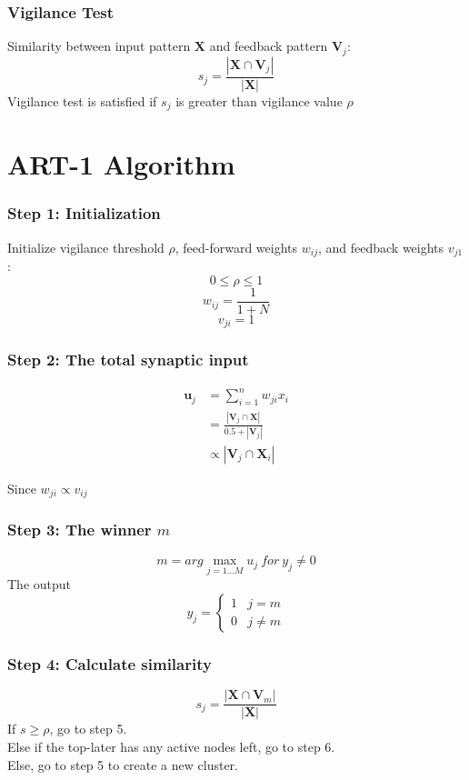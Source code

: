 \subsubsection{Vigilance Test}
Similarity between input pattern $\mathbf{X}$ and feedback pattern $\mathbf{V}_j$:
$$s_j = \frac{|\mathbf{X} \cap \mathbf{V}_j|}{| \mathbf{X} |}$$
Vigilance test is satisfied if $s_j$ is greater than vigilance value $\rho$

\section{ART-1 Algorithm}
\subsubsection{Step 1: Initialization}
Initialize vigilance threshold $\rho$, feed-forward weights $w_{ij}$, and feedback weights $v_{j1}$:
$$0 \le \rho \le 1$$
$$w_{ij} = \frac{1}{1+N}$$
$$v_{ji} = 1$$
\subsubsection{Step 2: The total synaptic input}
\begin{equation*}
\begin{split}
\mathbf{u}_j &= \sum_{i=1}^{n} w_{ji} x_i \\
&= \frac{|\mathbf{V}_j \cap \mathbf{X}|}{0.5 + |\mathbf{V}_j|} \\
& \propto | \mathbf{V}_j \cap \mathbf{X}_i |
\end{split}
\end{equation*}
\begin{center}Since $w_{ji} \propto v_{ij}$ \end{center}

\subsubsection{Step 3: The winner $m$}
$$m = arg\!\max_{j=1...M} u_j\ for\ y_j \ne 0$$
The output
$$
y_j = 
\begin{cases}
1 & j = m \\
0 & j \ne m
\end{cases}
$$
\subsubsection{Step 4: Calculate similarity}
$$s_j = \frac{|\mathbf{X} \cap \mathbf{V}_m |}{| \mathbf{X} |}$$
If $s \ge \rho$, go to step 5. \\
Else if the top-later has any active nodes left, go to step 6. \\
Else, go to step 5 to create a new cluster.
